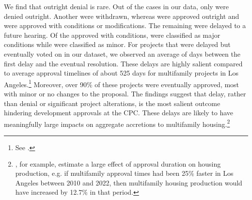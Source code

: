 We find that outright denial is rare. Out of the  cases in our data, only  were denied outright. Another  were withdrawn, whereas  were approved outright and  were approved with conditions or modifications. The remaining  were delayed to a future hearing. 
Of the  approved with conditions,  were classified as major conditions while  were classified as minor. 
For projects that were delayed but eventually voted on in our dataset, we observed an average of  days between the first delay and the eventual resolution. These delays are highly salient compared to average approval timelines of about 525 days for multifamily projects in Los Angeles.\footnote{See \citet{gabrielkung2025}.} Moreover, over 90\% of these projects were eventually approved, most with minor or no changes to the proposal. The findings suggest that delay, rather than denial or significant project alterations, is the most salient outcome hindering development approvals at the CPC. These delays are likely to have meaningfully large impacts on aggregate accretions to multifamily housing.\footnote{\citet{gabrielkung2025}, for example, estimate a large effect of approval duration on housing production, e.g. if multifamily approval times had been 25\% faster in Los Angeles between 2010 and 2022, then multifamily housing production would have increased by 12.7\% in that period.}


